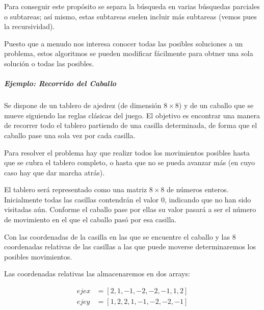 \documentclass[a4paper, 11pt, titlepage]{article}
\begin{document}
                Para conseguir este propósito se separa la búsqueda en varias búsquedas parciales o 
                subtareas; así mismo, estas subtareas suelen incluir más subtareas (vemos pues la 
                recursividad).

                Puesto que a menudo nos interesa conocer todas las posibles soluciones a un problema, 
                estos algoritmos se pueden modificar fácilmente para obtner una sola solución o todas 
                las posibles.

                \subparagraph{Ejemplo: Recorrido del Caballo}

                    Se dispone de un tablero de ajedrez (de dimensión $8\times 8$) y de un caballo que 
                    se mueve siguiendo las reglas clásicas del juego. El objetivo es encontrar una manera 
                    de recorrer todo el tablero partiendo de una casilla determinada, de forma que el 
                    caballo pase una sola vez por cada casilla.

                    Para resolver el problema hay que realizr todos los movimientos posibles hasta que 
                    se cubra el tablero completo, o hasta que no se pueda avanzar más (en cuyo caso hay 
                    que dar marcha atrás).

                    El tablero será representado como una matriz $8\times 8$ de números enteros. Inicialmente 
                    todas las casillas contendrán el valor 0, indicando que no han sido visitadas aún.
                    Conforme el caballo pase por ellas su valor pasará a ser el número de movimiento en el 
                    que el caballo pasó por esa casilla.

                    Con las coordenadas de la casilla en las que se encuentre el caballo y las 8 coordenadas 
                    relativas de las casillas a las que puede moverse determinaremos los posibles movimientos.

                    Las coordenadas relativas las almacenaremos en dos arrays:

                    \begin{equation}
                        \begin{split}
                            ejex &= [2,1,-1,-2,-2,-1,1,2] \\
                            ejey &= [1,2,2,1,-1,-2,-2,-1]
                            \nonumber
                        \end{split}
                    \end{equation}
\end{document}
